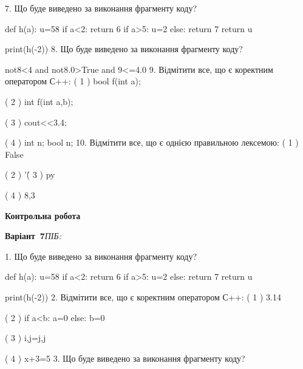 \documentclass[11pt]{article}
\begin{document}
\vspace{5mm}
7. Що буде виведено за виконання фрагменту коду?

def h(a):
    u=58
    if a<2: 
        return 6
    if a>5:
         u=2
    else:
         return 7
    return u

print(h(-2))
\vspace{5mm}
8. Що буде виведено за виконання фрагменту коду?

not8<4 and not8.0>True and 9<=4.0
\vspace{5mm}
9. %
Відмітити все, що є коректним оператором С++:
( 1 ) bool f(int a);

( 2 ) int f(int a,b);

( 3 ) cout<<3.4;

( 4 ) int n; bool n;
\vspace{5mm}
10. %
Відмітити все, що є однією правильною лексемою:
( 1 ) False

( 2 ) '\'

( 3 ) py

( 4 ) 8,3
\vspace{5mm}










\newpage

\newpage

{\large\textbf{Контрольна робота}}

\textbf{Варіант \No\,7}\hfill \textit{ПІБ:}\,\underline{\hspace{60mm}}
\vspace{4mm}

1. Що буде виведено за виконання фрагменту коду?

def h(a):
    u=58
    if a<2: 
        return 6
    if a>5:
         u=2
    else:
         return 7
    return u

print(h(-2))
\vspace{5mm}
2. %
Відмітити все, що є коректним оператором С++:
( 1 ) 3.14%

( 2 ) if a<b: a=0 else: b=0

( 3 ) i,j=j,j

( 4 ) x+3=5
\vspace{5mm}
3. Що буде виведено за виконання фрагменту коду?
\end{document}
